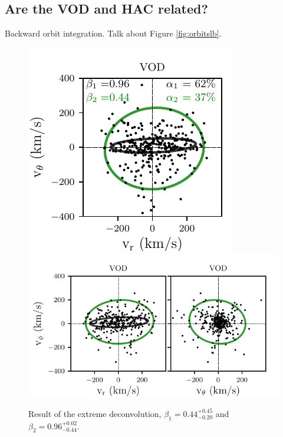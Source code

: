 \documentclass[fleqn,usenatbib]{mnras}
\begin{document}
\subsection{Are the VOD and HAC related?}
Backward orbit integration. Talk about Figure \ref{fig:orbitslb}.

\begin{figure}
    \includegraphics[scale=0.545]{VOD_velocities_vphi_gm2.pdf}
    \includegraphics[scale=0.545]{VOD_velocities_vtheta_gm2.pdf} 
   \caption{Result of the extreme deconvolution, $\beta_{1}=0.44^{+0.45}_{-0.20}$ and $\beta_{2}= 0.96^{+0.02}_{-0.44}$. }
    \label{fig:xd}
\end{figure}
\end{document}
